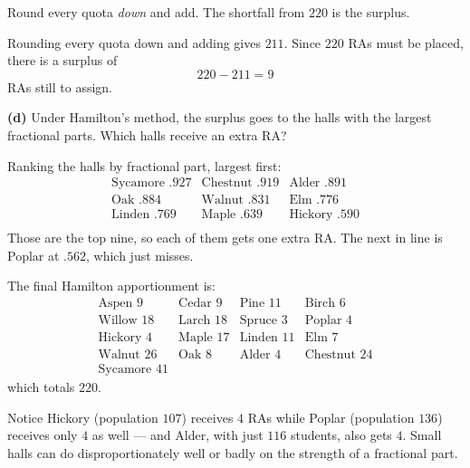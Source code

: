 \documentclass[12pt]{ximera}
\begin{document}
\begin{problem}
\begin{prompt}
\begin{hint}
Round every quota \emph{down} and add. The shortfall from $220$ is the surplus.
\end{hint}

\begin{feedback}
Rounding every quota down and adding gives $211$. Since $220$ RAs must be placed, there
is a surplus of
\[ 220 - 211 = 9 \]
RAs still to assign.
\end{feedback}
\end{prompt}

\begin{prompt}
\textbf{(d)} Under Hamilton's method, the surplus goes to the halls with the largest
fractional parts. Which halls receive an extra RA?

\begin{selectAll}
\end{selectAll}

\begin{feedback}
Ranking the halls by fractional part, largest first:
\[
\begin{array}{lll}
\text{Sycamore } .927 & \text{Chestnut } .919 & \text{Alder } .891\\
\text{Oak } .884 & \text{Walnut } .831 & \text{Elm } .776\\
\text{Linden } .769 & \text{Maple } .639 & \text{Hickory } .590\\
\end{array}
\]
Those are the top nine, so each of them gets one extra RA. The next in line is Poplar
at $.562$, which just misses.

The final Hamilton apportionment is:
\[
\begin{array}{llll}
\text{Aspen } 9 & \text{Cedar } 9 & \text{Pine } 11 & \text{Birch } 6\\
\text{Willow } 18 & \text{Larch } 18 & \text{Spruce } 3 & \text{Poplar } 4\\
\text{Hickory } 4 & \text{Maple } 17 & \text{Linden } 11 & \text{Elm } 7\\
\text{Walnut } 26 & \text{Oak } 8 & \text{Alder } 4 & \text{Chestnut } 24\\
\text{Sycamore } 41 & & &
\end{array}
\]
which totals $220$. \checkmark

Notice Hickory (population $107$) receives $4$ RAs while Poplar (population $136$)
receives only $4$ as well --- and Alder, with just $116$ students, also gets $4$. Small
halls can do disproportionately well or badly on the strength of a fractional part.
\end{feedback}
\end{prompt}
\end{problem}
\end{document}

